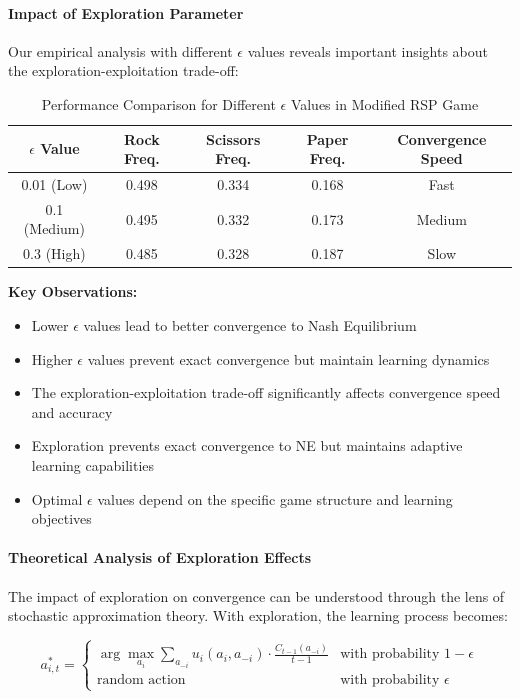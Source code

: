 \documentclass[conference]{IEEEtran}
\begin{document}
\paragraph{Impact of Exploration Parameter}

Our empirical analysis with different $\epsilon$ values reveals important insights about the exploration-exploitation trade-off:

\begin{table}[h!]
\centering
\caption{Performance Comparison for Different $\epsilon$ Values in Modified RSP Game}
\begin{tabular}{|c|c|c|c|c|}
\hline
$\epsilon$ Value & Rock Freq. & Scissors Freq. & Paper Freq. & Convergence Speed \\
\hline
0.01 (Low) & 0.498 & 0.334 & 0.168 & Fast \\
0.1 (Medium) & 0.495 & 0.332 & 0.173 & Medium \\
0.3 (High) & 0.485 & 0.328 & 0.187 & Slow \\
\hline
\end{tabular}
\label{tab:epsilon_comparison}
\end{table}

\textbf{Key Observations:}
\begin{itemize}
    \item Lower $\epsilon$ values lead to better convergence to Nash Equilibrium
    \item Higher $\epsilon$ values prevent exact convergence but maintain learning dynamics
    \item The exploration-exploitation trade-off significantly affects convergence speed and accuracy
    \item Exploration prevents exact convergence to NE but maintains adaptive learning capabilities
    \item Optimal $\epsilon$ values depend on the specific game structure and learning objectives
\end{itemize}

\paragraph{Theoretical Analysis of Exploration Effects}

The impact of exploration on convergence can be understood through the lens of stochastic approximation theory. With exploration, the learning process becomes:

\begin{equation}
a_{i,t}^* = \begin{cases}
\arg\max_{a_i} \sum_{a_{-i}} u_i(a_i, a_{-i}) \cdot \frac{C_{t-1}(a_{-i})}{t-1} & \text{with probability } 1-\epsilon \\
\text{random action} & \text{with probability } \epsilon
\end{cases}
\end{equation}
\end{document}
